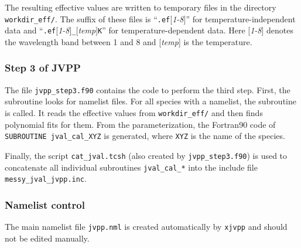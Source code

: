 \documentclass[a4paper,twoside]{article}
\newcommand{\IT}[1]{#1\index{#1}}
\begin{document}
The resulting effective values are written to temporary files in the
directory \verb|workdir_eff/|. The suffix of these files is
``\verb|.ef|[{\em 1-8}\/]'' for temperature-independent data and
``\verb|.ef|[{\em 1-8}\/]\verb|_|[{\em temp}\/]\verb|K|'' for
temperature-dependent data. Here [{\em 1-8}\/] denotes the wavelength
band between 1 and 8 and [{\em temp}\/] is the temperature.

\subsubsection{Step 3 of \IT{JVPP}}

The file \verb|jvpp_step3.f90| contains the code to perform the third
step. First, the subroutine  looks for namelist
files. For all species with a namelist, the subroutine
 is called. It reads the effective values from
\verb|workdir_eff/| and then finds polynomial fits for them. From the
parameterization, the Fortran90 code of \verb|SUBROUTINE jval_cal_XYZ|
is generated, where \verb|XYZ| is the name of the species.

Finally, the script \verb|cat_jval.tcsh| (also created by
\verb|jvpp_step3.f90|) is used to concatenate all individual subroutines
\verb|jval_cal_*| into the include file \verb|messy_jval_jvpp.inc|.

\subsubsection{Namelist control}
\label{sec:nml}

The main namelist file \verb|jvpp.nml| is created automatically by
\verb|xjvpp| and should not be edited manually.
\end{document}
